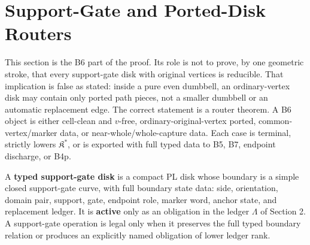 \documentclass[11pt]{amsart}
\theoremstyle{definition}
\begin{document}
\section{Support-Gate and Ported-Disk Routers}

This section is the B6 part of the proof. Its role is not to prove, by one
geometric stroke, that every support-gate disk with original vertices is
reducible. That implication is false as stated: inside a pure even dumbbell, an
ordinary-vertex disk may contain only ported path pieces, not a smaller dumbbell
or an automatic replacement edge. The correct statement is a router theorem. A
B6 object is either cell-clean and \(v\)-free, ordinary-original-vertex ported,
common-vertex/marker data, or near-whole/whole-capture data. Each case is
terminal, strictly lowers \(\mathfrak K^\ast\), or is exported with full typed data
to B5, B7, endpoint discharge, or B4p.

A \textbf{typed support-gate disk} is a compact PL disk whose boundary is a simple
closed support-gate curve, with full boundary state data: side, orientation,
domain pair, support, gate, endpoint role, marker word, anchor state, and
replacement ledger. It is \textbf{active} only as an obligation in the ledger
\(\Lambda\) of Section 2. A support-gate operation is legal only when it preserves
the full typed boundary relation or produces an explicitly named obligation of
lower ledger rank.
\end{document}
